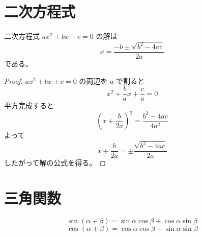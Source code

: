 \documentclass{article}
\begin{document}
\section{二次方程式}

\begin{theorem}[解の公式]
二次方程式 $ax^2 + bx + c = 0$ の解は
\[
  x = \frac{-b \pm \sqrt{b^2 - 4ac}}{2a}
\]
である。
\end{theorem}

\begin{proof}
$ax^2 + bx + c = 0$ の両辺を $a$ で割ると
\[
  x^2 + \frac{b}{a}x + \frac{c}{a} = 0
\]
平方完成すると
\[
  \left(x + \frac{b}{2a}\right)^2 = \frac{b^2 - 4ac}{4a^2}
\]
よって
\[
  x + \frac{b}{2a} = \pm \frac{\sqrt{b^2 - 4ac}}{2a}
\]
したがって解の公式を得る。
\end{proof}

\section{三角関数}

\begin{theorem}[加法定理]
\[
  \sin(\alpha + \beta) = \sin\alpha\cos\beta + \cos\alpha\sin\beta
\]
\[
  \cos(\alpha + \beta) = \cos\alpha\cos\beta - \sin\alpha\sin\beta
\]
\end{theorem}
\end{document}
